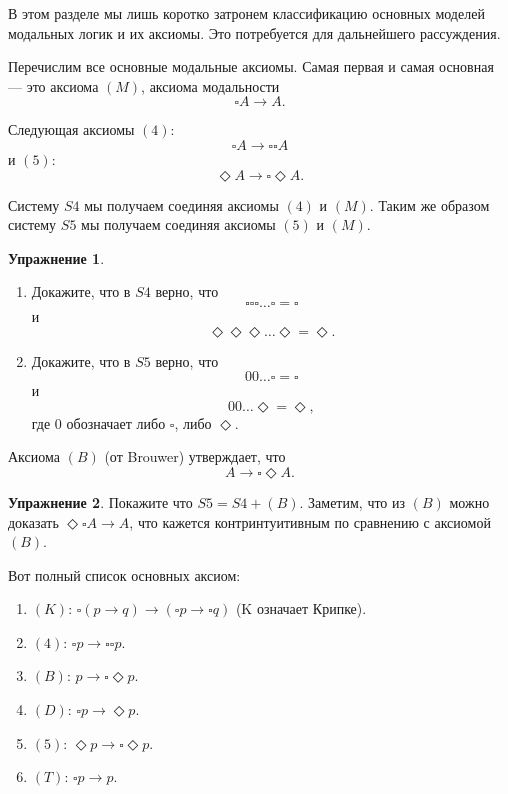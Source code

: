 \documentclass[openany]{book}
\theoremstyle{plain}
\theoremstyle{definition}
\newtheorem{xrc}{Упражнение}[]
\begin{document}
В этом разделе мы лишь коротко затронем классификацию основных моделей модальных логик и их аксиомы. Это потребуется для дальнейшего рассуждения.

Перечислим все основные модальные аксиомы. Самая первая и самая основная --- это аксиома \((M)\), аксиома модальности \[\square A \to A.\]

Следующая аксиомы \((4)\): \[\square A \to \square \square A\] и \((5)\): \[\Diamond A \to \square \Diamond A.\]

Систему \(S4\) мы получаем соединяя аксиомы \((4)\) и \((M)\). Таким же образом систему \(S5\) мы получаем соединяя аксиомы \((5)\) и \((M)\).

\begin{xrc}
    \begin{enumerate}
	\item Докажите, что в \(S4\) верно, что \[\square \square \square \dots \square = \square \] и \[\Diamond \Diamond \Diamond \dots \Diamond = \Diamond.\]
	\item Докажите, что в \(S5\) верно, что \[0 0 \dots \square = \square\] и \[0 0 \dots \Diamond = \Diamond,\] где \(0\) обозначает либо \(\square\), либо \(\Diamond\).
    \end{enumerate}
\end{xrc}

Аксиома \((B)\) (от Brouwer) утверждает, что \[A \to \square \Diamond A.\]

\begin{xrc}
    Покажите что \(S5 = S4 + (B)\). Заметим, что из \((B)\) можно доказать \(\Diamond \square A \to A\), что кажется контринтуитивным по сравнению с аксиомой \((B)\).
\end{xrc}

Вот полный список основных аксиом:
\begin{enumerate}
    \item \((K)\): \(\square(p \to q) \to (\square p \to \square q)\) (K означает Крипке).
    \item \((4)\): \(\square p \to \square \square p\).
    \item \((B)\): \(p \to \square \Diamond p\).
    \item \((D)\): \(\square p \to \Diamond p\).
    \item \((5)\): \(\Diamond p \to \square \Diamond p\).
    \item \((T)\): \(\square p \to p\).
\end{enumerate}
\end{document}

